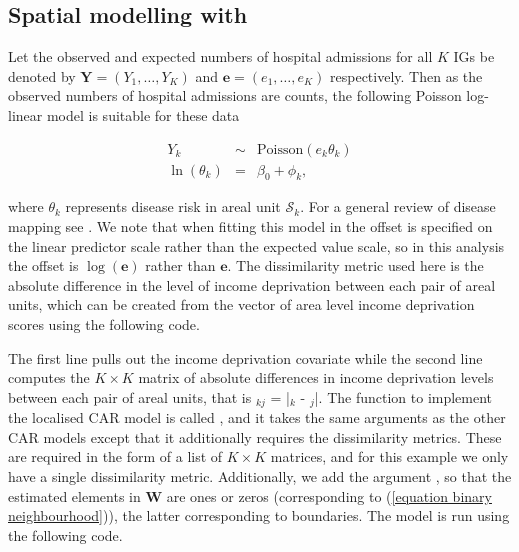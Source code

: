 \documentclass[article,shortnames,nojss]{jss}
\begin{document}
\subsection[Spatial modelling with CARBayes]{Spatial modelling with }
Let the  observed and expected numbers of hospital admissions for all $K$ IGs be denoted by $\mathbf{Y}=(Y_{1},\ldots,Y_{K})$ and $\mathbf{e}=(e_{1},\ldots,e_{K})$ respectively. Then as the observed numbers of hospital admissions are counts, the following Poisson log-linear model is suitable for these data

\begin{eqnarray}
Y_{k}&\sim&\mbox{Poisson}(e_{{k}}\theta_{k})\nonumber\\
\ln(\theta_{k})&=&\beta_{0}+\phi_{k},\nonumber
\end{eqnarray}

where $\theta_{k}$ represents disease risk in areal unit $\mathcal{S}_{k}$. For a general review of disease mapping see \cite{wakefield2007}. We note that when fitting this model in  the offset is specified on the linear predictor scale rather than the expected value scale, so in this analysis the offset is $\log(\mathbf{e})$ rather than $\mathbf{e}$. The dissimilarity metric used here is the absolute difference in the level of income deprivation between each pair of areal units, which can be created from the  vector of area level income deprivation scores using the following code.

\begin{Schunk}
\end{Schunk}

The first line pulls out the income deprivation covariate while the second line computes the $K\times K$ matrix of absolute differences in income deprivation levels between each pair of areal units, that is $_{kj}$ = |$_{k}$ - $_{j}$|. The function to implement the localised CAR model is called , and it takes the same arguments as the other CAR models except that it additionally requires the dissimilarity metrics. These are required in the form of a list of $K\times K$ matrices, and for this example we only have a single dissimilarity metric. Additionally, we add the argument , so that the estimated elements in $$ are ones or zeros (corresponding to (\ref{equation binary neighbourhood})), the latter corresponding to boundaries. The model is run using the following code.
\end{document}
